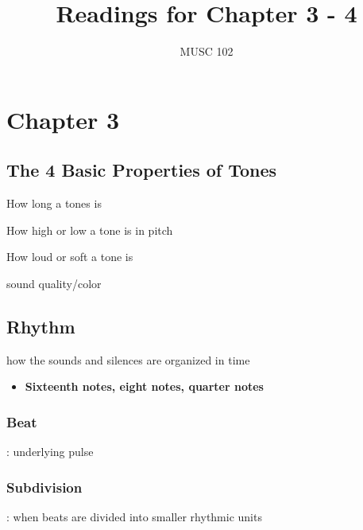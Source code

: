 \documentclass[
  12pt,
]{article}
\title{Readings for Chapter 3 - 4}
\author{MUSC 102}
\date{}
\providecommand{\tightlist}{%
  \setlength{\itemsep}{0pt}\setlength{\parskip}{0pt}}
\begin{document}
\maketitle

\chapter{Chapter 3}\label{chapter-3}

\section{The 4 Basic Properties of Tones}\label{the-4-basic-properties-of-tones}

\begin{description}
\tightlist
\item[Duration]
How long a tones is
\item[Frequency]
How high or low a tone is in pitch
\item[Amplitude]
How loud or soft a tone is
\item[Timbre]
sound quality/color
\end{description}

\section{Rhythm}\label{rhythm}

\begin{description}
\tightlist
\item[rhythm]
how the sounds and silences are organized in time
\end{description}

\begin{itemize}
\tightlist
\item
  \textbf{Sixteenth notes, eight notes, quarter notes}
\end{itemize}

\subsection{Beat}\label{beat}

: underlying pulse

\subsection{Subdivision}\label{subdivision}

: when beats are divided into smaller rhythmic units
\end{document}
